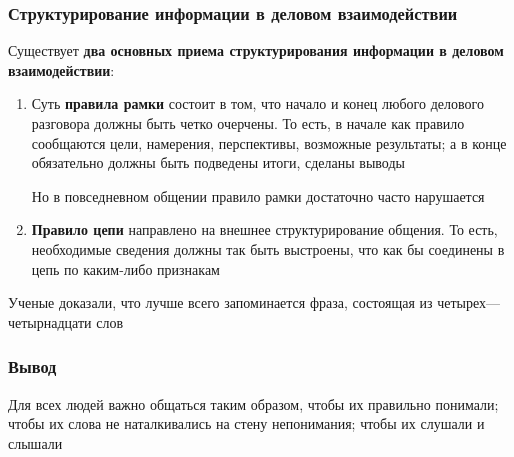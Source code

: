 \documentclass{article}
\begin{document}
\subsubsection{Структурирование информации в деловом взаимодействии}

Существует \textbf{два основных приема структурирования информации в деловом взаимодействии}:

\begin{enumerate}
    \item Суть \textbf{правила рамки} состоит в том, что начало и конец любого делового разговора должны быть четко очерчены. То есть, в начале как правило сообщаются цели, намерения, перспективы, возможные результаты; а в конце обязательно должны быть подведены итоги, сделаны выводы

    Но в повседневном общении правило рамки достаточно часто нарушается
    \item \textbf{Правило цепи} направлено на внешнее структурирование общения. То есть, необходимые сведения должны так быть выстроены, что как бы соединены в цепь по каким-либо признакам
\end{enumerate}
    
Ученые доказали, что лучше всего запоминается фраза, состоящая из четырех—четырнадцати слов

\subsubsection{Вывод}

Для всех людей важно общаться таким образом, чтобы их правильно понимали; чтобы их слова не наталкивались на стену непонимания; чтобы их слушали и слышали
\end{document}
